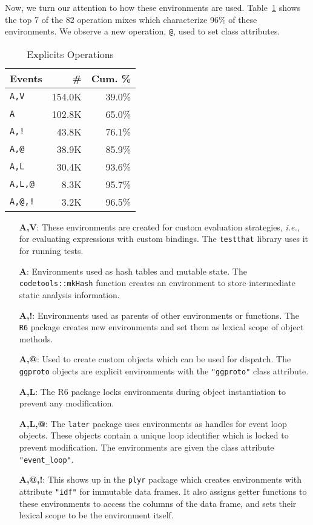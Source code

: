 \documentclass[10pt,review,sigplan,authorversion=true]{acmart}
\renewcommand{\c}[1]{\lstinline |#1|\xspace}
\newcommand{\ie}{\emph{i.e.},\xspace}
\begin{document}
Now, we turn our attention to how these environments are used.
Table~\ref{table:user_explicit_env_seq} shows the top 7 of the 82 operation
mixes which characterize 96\% of these environments. We observe a new operation,
\texttt{@}, used to set class attributes.

\begin{table}[!h]\small
  \caption{Explicits Operations} \label{table:user_explicit_env_seq}
  \centering
  \begin{tabular}{lrr}    \toprule
    \textbf{Events}&\textbf{\#}&\textbf{Cum. \%}\\
    \midrule
    \texttt{A,V}&154.0K&39.0\%\\
    \texttt{A}&102.8K&65.0\%\\
    \texttt{A,!}&43.8K&76.1\%\\
    \texttt{A,@}&38.9K&85.9\%\\
    \texttt{A,L}&30.4K&93.6\%\\
    \texttt{A,L,@}&8.3K&95.7\%\\
    \texttt{A,@,!}&3.2K&96.5\%\\
    \bottomrule
  \end{tabular}
\end{table}

\begin{itemize}
  \item[{\bf A,V}:] These environments are created for custom evaluation
    strategies, \ie for evaluating expressions with custom bindings. The
    \c{testthat} library uses it for running tests.

\item[{\bf A}:] Environments used as hash tables and mutable state. The
  \c{codetools::mkHash} function creates an environment to store intermediate
  static analysis information.

\item[{\bf A,!}:] Environments used as parents of other environments or
  functions. The \c{R6} package creates new environments and set them as lexical
  scope of object methods.

\item[{\bf A,@}:] Used to create custom objects which can be used for dispatch.
  The \c{ggproto} objects are explicit environments with the \c{"ggproto"} class
  attribute.

\item[{\bf A,L}:] The R6 package locks environments during object instantiation
  to prevent any modification.

\item[{\bf A,L,@}:] The \c{later} package uses environments as handles for event
  loop objects. These objects contain a unique loop identifier which is locked
  to prevent modification. The environments are given the class attribute
  \c{"event_loop"}.

\item[{\bf A,@,!}:] This shows up in the \c{plyr} package which creates
  environments with attribute \c{"idf"} for immutable data frames. It also
  assigns getter functions to these environments to access the columns of the
  data frame, and sets their lexical scope to be the environment itself.
\end{itemize}
\end{document}
